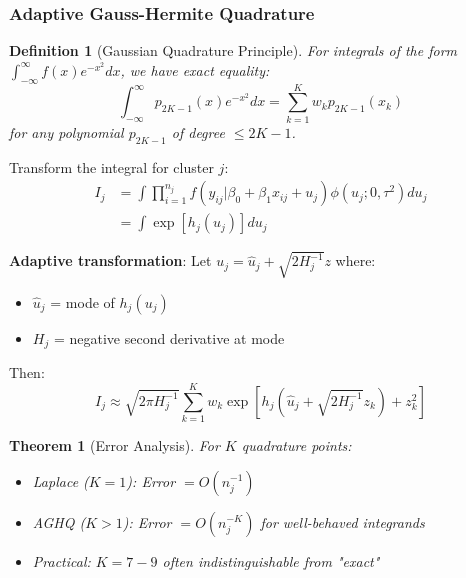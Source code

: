 \documentclass{article}
\newtheorem{definition}{Definition}
\newtheorem{theorem}{Theorem}
\begin{document}
\subsubsection{Adaptive Gauss-Hermite Quadrature}

\begin{definition}[Gaussian Quadrature Principle]
For integrals of the form $\int_{-\infty}^{\infty} f(x)e^{-x^2}dx$, we have exact equality:
\begin{equation}
\int_{-\infty}^{\infty} p_{2K-1}(x)e^{-x^2}dx = \sum_{k=1}^K w_k p_{2K-1}(x_k)
\end{equation}
for any polynomial $p_{2K-1}$ of degree $\leq 2K-1$.
\end{definition}

\begin{example}
Transform the integral for cluster $j$:
\begin{align}
I_j &= \int \prod_{i=1}^{n_j} f(y_{ij}|\beta_0 + \beta_1 x_{ij} + u_j) \phi(u_j; 0, \tau^2) du_j \\
&= \int \exp[h_j(u_j)] du_j
\end{align}

\textbf{Adaptive transformation}: Let $u_j = \hat{u}_j + \sqrt{2H_j^{-1}} z$ where:
\begin{itemize}
    \item $\hat{u}_j$ = mode of $h_j(u_j)$
    \item $H_j$ = negative second derivative at mode
\end{itemize}

Then:
\begin{equation}
I_j \approx \sqrt{2\pi H_j^{-1}} \sum_{k=1}^K w_k \exp[h_j(\hat{u}_j + \sqrt{2H_j^{-1}} z_k) + z_k^2]
\end{equation}
\end{example}

\begin{theorem}[Error Analysis]
For $K$ quadrature points:
\begin{itemize}
    \item Laplace ($K=1$): Error $= O(n_j^{-1})$
    \item AGHQ ($K>1$): Error $= O(n_j^{-K})$ for well-behaved integrands
    \item Practical: $K=7-9$ often indistinguishable from "exact"
\end{itemize}
\end{theorem}
\end{document}
